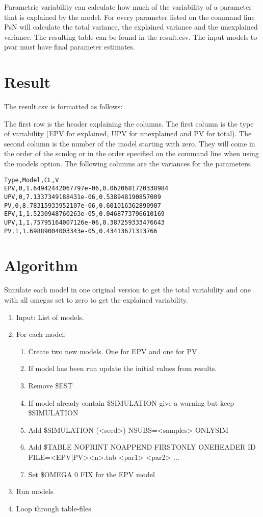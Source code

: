 Parametric variability can calculate how much of the variability of a parameter that is explained by the model. For every parameter listed on the command line PsN will calculate the total variance, the explained variance and the unexplained variance. The resulting table can be found in the result.csv. The input models to pvar must have final parameter estimates.

\section{Result}

The result.csv is formatted as follows:

The first row is the header explaining the columns.
The first column is the type of variability (EPV for explained, UPV for unexplained and PV for total). The second column is the number of the model starting with zero. They will come in the order of the scmlog or in the order specified on the command line when using the models option. The following columns are the variances for the parameters.

\begin{verbatim}
Type,Model,CL,V
EPV,0,1.64942442067797e-06,0.0620681720338984
UPV,0,7.1337349188431e-06,0.538948190857009
PV,0,8.78315933952107e-06,0.601016362890907
EPV,1,1.5230948760263e-05,0.0468773796610169
UPV,1,1.75795164007126e-06,0.387259333476643
PV,1,1.69889004003343e-05,0.43413671313766
\end{verbatim}

\section{Algorithm}

Simulate each model in one original version to get the total variability and one with all omegas set to zero to get the explained variability.

\begin{enumerate}
	\item Input: List of models.
	\item For each model:
	\begin{enumerate}
		\item Create two new models. One for EPV and one for PV
		\item If model has been run update the initial values from results.
		\item Remove \$EST
		\item If model already contain \$SIMULATION give a warning but keep \$SIMULATION
		\item Add \$SIMULATION (<seed>) NSUBS=<samples> ONLYSIM
		\item Add \$TABLE NOPRINT NOAPPEND FIRSTONLY ONEHEADER ID FILE=<EPV|PV><n>.tab <par1> <par2> ...
		\item Set \$OMEGA 0 FIX for the EPV model
	\end{enumerate}
	\item Run models
	\item Loop through table-files
\end{enumerate}


